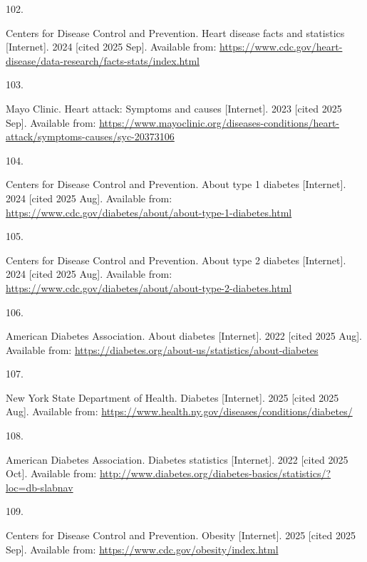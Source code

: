 \documentclass[
  english,
  letterpaper,
]{report}
\newlength{\cslhangindent}
\newlength{\csllabelwidth}
\newenvironment{CSLReferences}[2] %
 {\begin{list}{}{%
  \setlength{\itemindent}{0pt}
  \setlength{\leftmargin}{0pt}
  \setlength{\parsep}{0pt}
  \ifodd #1
   \setlength{\leftmargin}{\cslhangindent}
   \setlength{\itemindent}{-1\cslhangindent}
  \fi
  \setlength{\itemsep}{#2\baselineskip}}}
 {\end{list}}
\newcommand{\CSLLeftMargin}[1]{\parbox[t]{\csllabelwidth}{\strut#1\strut}}
\newcommand{\CSLRightInline}[1]{\parbox[t]{\linewidth - \csllabelwidth}{\strut#1\strut}}
\begin{document}
\begin{CSLReferences}{0}{1}
\CSLLeftMargin{102. }%
\CSLRightInline{Centers for Disease Control and Prevention. Heart
disease facts and statistics {[}Internet{]}. 2024 {[}cited 2025 Sep{]}.
Available from:
\url{https://www.cdc.gov/heart-disease/data-research/facts-stats/index.html}}

\CSLLeftMargin{103. }%
\CSLRightInline{Mayo Clinic. Heart attack: Symptoms and causes
{[}Internet{]}. 2023 {[}cited 2025 Sep{]}. Available from:
\url{https://www.mayoclinic.org/diseases-conditions/heart-attack/symptoms-causes/syc-20373106}}

\CSLLeftMargin{104. }%
\CSLRightInline{Centers for Disease Control and Prevention. About type 1
diabetes {[}Internet{]}. 2024 {[}cited 2025 Aug{]}. Available from:
\url{https://www.cdc.gov/diabetes/about/about-type-1-diabetes.html}}

\CSLLeftMargin{105. }%
\CSLRightInline{Centers for Disease Control and Prevention. About type 2
diabetes {[}Internet{]}. 2024 {[}cited 2025 Aug{]}. Available from:
\url{https://www.cdc.gov/diabetes/about/about-type-2-diabetes.html}}

\CSLLeftMargin{106. }%
\CSLRightInline{American Diabetes Association. About diabetes
{[}Internet{]}. 2022 {[}cited 2025 Aug{]}. Available from:
\url{https://diabetes.org/about-us/statistics/about-diabetes}}

\CSLLeftMargin{107. }%
\CSLRightInline{New York State Department of Health. Diabetes
{[}Internet{]}. 2025 {[}cited 2025 Aug{]}. Available from:
\url{https://www.health.ny.gov/diseases/conditions/diabetes/}}

\CSLLeftMargin{108. }%
\CSLRightInline{American Diabetes Association. Diabetes statistics
{[}Internet{]}. 2022 {[}cited 2025 Oct{]}. Available from:
\url{http://www.diabetes.org/diabetes-basics/statistics/?loc=db-slabnav}}

\CSLLeftMargin{109. }%
\CSLRightInline{Centers for Disease Control and Prevention. Obesity
{[}Internet{]}. 2025 {[}cited 2025 Sep{]}. Available from:
\url{https://www.cdc.gov/obesity/index.html}}


\end{CSLReferences}
\end{document}
